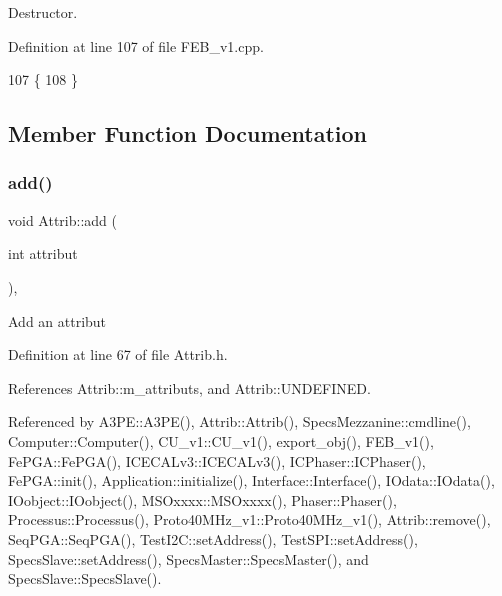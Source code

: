 Destructor. 



Definition at line 107 of file F\+E\+B\+\_\+v1.\+cpp.


\begin{DoxyCode}
107                 \{
108 \}
\end{DoxyCode}


\subsection{Member Function Documentation}
\mbox{\label{classAttrib_a235f773af19c900264a190b00a3b4ad7}} 
\subsubsection{\texorpdfstring{add()}{add()}}
{\footnotesize\ttfamily void Attrib\+::add (\begin{DoxyParamCaption}\item[{int}]{attribut }\end{DoxyParamCaption})\hspace{0.3cm}{\ttfamily [inline]}, {\ttfamily [inherited]}}

Add an attribut 

Definition at line 67 of file Attrib.\+h.



References Attrib\+::m\+\_\+attributs, and Attrib\+::\+U\+N\+D\+E\+F\+I\+N\+ED.



Referenced by A3\+P\+E\+::\+A3\+P\+E(), Attrib\+::\+Attrib(), Specs\+Mezzanine\+::cmdline(), Computer\+::\+Computer(), C\+U\+\_\+v1\+::\+C\+U\+\_\+v1(), export\+\_\+obj(), F\+E\+B\+\_\+v1(), Fe\+P\+G\+A\+::\+Fe\+P\+G\+A(), I\+C\+E\+C\+A\+Lv3\+::\+I\+C\+E\+C\+A\+Lv3(), I\+C\+Phaser\+::\+I\+C\+Phaser(), Fe\+P\+G\+A\+::init(), Application\+::initialize(), Interface\+::\+Interface(), I\+Odata\+::\+I\+Odata(), I\+Oobject\+::\+I\+Oobject(), M\+S\+Oxxxx\+::\+M\+S\+Oxxxx(), Phaser\+::\+Phaser(), Processus\+::\+Processus(), Proto40\+M\+Hz\+\_\+v1\+::\+Proto40\+M\+Hz\+\_\+v1(), Attrib\+::remove(), Seq\+P\+G\+A\+::\+Seq\+P\+G\+A(), Test\+I2\+C\+::set\+Address(), Test\+S\+P\+I\+::set\+Address(), Specs\+Slave\+::set\+Address(), Specs\+Master\+::\+Specs\+Master(), and Specs\+Slave\+::\+Specs\+Slave().


